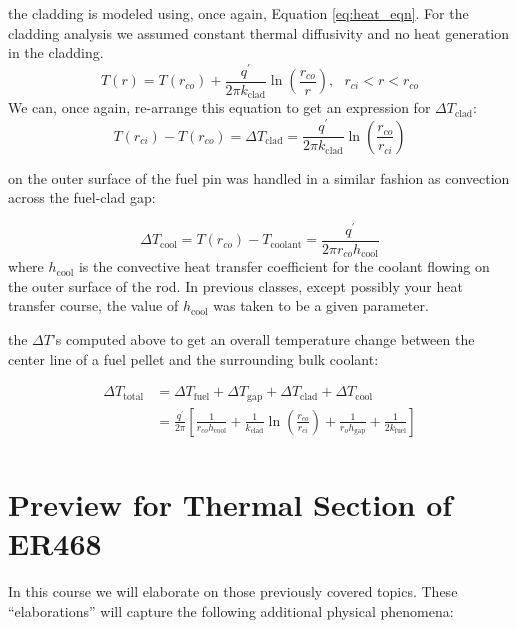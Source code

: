  the cladding is modeled using, once again, Equation \ref{eq:heat_eqn}.  For the cladding analysis we assumed constant thermal diffusivity and no heat generation in the cladding.
$$T(r) = T(r_{co}) + \frac{q^{\prime}}{2 \pi k_{\text{clad}}}\ln{\left(\frac{r_{co}}{r} \right)}, \ \ \ r_{ci} < r < r_{co}$$
We can, once again, re-arrange this equation to get an expression for $\Delta T_{\text{clad}}$:
$$T(r_{ci}) - T(r_{co}) = \Delta T_{\text{clad}} = \frac{q^{\prime}}{2 \pi k_{\text{clad}}}\ln{\left(\frac{r_{co}}{r_{ci}} \right)}$$

 on the outer surface of the fuel pin was handled in a similar fashion as convection across the fuel-clad gap:

$$\Delta T_{\text{cool}} = T(r_{co}) - T_{\text{coolant}} = \frac{q^{\prime}}{2 \pi r_{co} h_{\text{cool}}}$$
where $h_{\text{cool}}$ is the convective heat transfer coefficient for the coolant flowing on the outer surface of the rod.  In previous classes, except possibly your heat transfer course, the value of $h_{\text{cool}}$ was taken to be a given parameter.  

 the $\Delta T$'s computed above to get an overall temperature change between the center line of a fuel pellet and the surrounding bulk coolant:

\begin{align*}
\Delta T_{\text{total}} &= \Delta T_{\text{fuel}} + \Delta T_{\text{gap}} + \Delta T_{\text{clad}} + \Delta T_{\text{cool}} \\
&= \frac{q^{\prime}}{2 \pi}\left[\frac{1}{r_{co}h_{\text{cool}}} + \frac{1}{k_{\text{clad}}} \ln{\left(\frac{r_{co}}{r_{ci}} \right)} + \frac{1}{r_o h_{\text{gap}}}+ \frac{1}{2 k_{\text{fuel}}}\right] \\
\end{align*}

\section{Preview for Thermal Section of ER468}
In this course we will elaborate on those previously covered topics.  These ``elaborations'' will capture the following additional physical phenomena:

